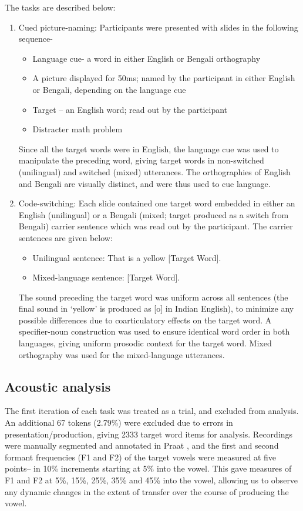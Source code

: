 \documentclass[charis,linguex]{glossa}
\newcommand{\nt}[1]{\textipa{[#1]}} %
\begin{document}
The tasks are described below:


\begin{enumerate}[]
	\item Cued picture-naming: Participants were presented with slides in the following sequence-
	\begin{itemize}
		\item Language cue- a word in either English or Bengali orthography
		\item A picture displayed for 50ms; named by the participant in either English or Bengali, depending on the language cue 
		\item Target -- an English word; read out by the participant
		\item Distracter math problem
	\end{itemize}
	Since all the target words were in English, the language cue was used to manipulate the preceding word, giving target words in non-switched (unilingual) and switched (mixed) utterances. The orthographies of English and Bengali are visually distinct, and were thus used to cue language.
	
	\item Code-switching: Each slide contained one target word embedded in either an English (unilingual) or a Bengali (mixed; target produced as a switch from Bengali) carrier sentence which was read out by the participant. The carrier sentences are given below:
	\begin{itemize}
		\item Unilingual sentence: That is a yellow [Target Word].
		\item Mixed-language sentence:  [Target Word].
	\end{itemize}
	
	The sound preceding the target word was uniform across all sentences (the final sound in `yellow' is produced as [o] in Indian English), to minimize any possible differences due to coarticulatory effects on the target word. A specifier-noun construction was used to ensure identical word order in both languages, giving uniform prosodic context for the target word. Mixed orthography was used for the mixed-language utterances. \\
	
\end{enumerate}
\subsection{Acoustic analysis}\label{analysis}
The first iteration of each task was treated as a trial, and excluded from analysis. An additional 67 tokens (2.79\%) were excluded due to errors in presentation/production, giving 2333 target word items for analysis. Recordings were manually segmented and annotated in Praat \citep{boersma2016praat}, and the first and second formant frequencies (F1 and F2) of the target vowels \nt{2, ae} were measured at five points-- in 10\% increments starting at 5\% into the vowel. This gave measures of F1 and F2 at 5\%, 15\%, 25\%, 35\% and 45\% into the vowel, allowing us to observe any dynamic changes in the extent of transfer over the course of producing the vowel.
\end{document}
